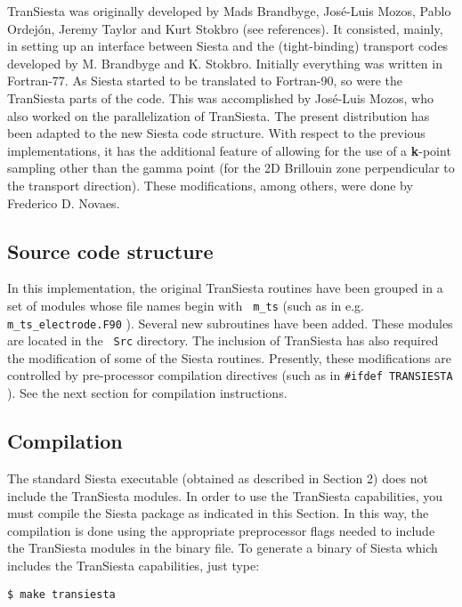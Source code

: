 \documentclass[11pt]{article}
\begin{document}
{\sc TranSiesta} was originally developed by Mads Brandbyge,
Jos\'e-Luis Mozos, Pablo Ordej\'on, Jeremy Taylor and Kurt Stokbro
(see references). It consisted, mainly, in setting up an interface
between {\sc Siesta} and the (tight-binding) transport codes developed
by M. Brandbyge and K. Stokbro. Initially everything was written in
Fortran-77. As {\sc Siesta} started to be translated to Fortran-90, so
were the {\sc TranSiesta} parts of the code. This was accomplished by
Jos\'e-Luis Mozos, who also worked on the parallelization of {\sc
  TranSiesta}.  The present distribution has been adapted to the new
{\sc Siesta} code structure. With respect to the previous
implementations, it has the additional feature of allowing for the use
of a {\bf k}-point sampling other than the gamma point (for the 2D
Brillouin zone perpendicular to the transport direction).  These
modifications, among others, were done by Frederico D. Novaes.

\subsection{Source code structure}

In this implementation, the original {\sc TranSiesta} routines have
been grouped in a set of modules whose file names begin with {\tt
  m\_ts} (such as in e.g. {\tt m\_ts\_electrode.F90} ).  Several new
subroutines have been added.  These modules are located in the {\tt
  Src} directory.  The inclusion of {\sc TranSiesta} has also required
the modification of some of the {\sc Siesta} routines. Presently,
these modifications are controlled by pre-processor compilation
directives (such as in {\tt \#ifdef TRANSIESTA} ). See the next
section for compilation instructions.

\subsection{Compilation}

The standard {\sc Siesta} executable (obtained as described in Section
2) does not include the {\sc TranSiesta} modules. In order to use the
{\sc TranSiesta} capabilities, you must compile the {\sc Siesta}
package as indicated in this Section. In this way, the compilation is
done using the appropriate preprocessor flags needed to include the
{\sc TranSiesta} modules in the binary file. To generate a binary of
{\sc Siesta} which includes the {\sc TranSiesta} capabilities, just
type:

\begin{verbatim}
$ make transiesta
\end{verbatim}
\end{document}
